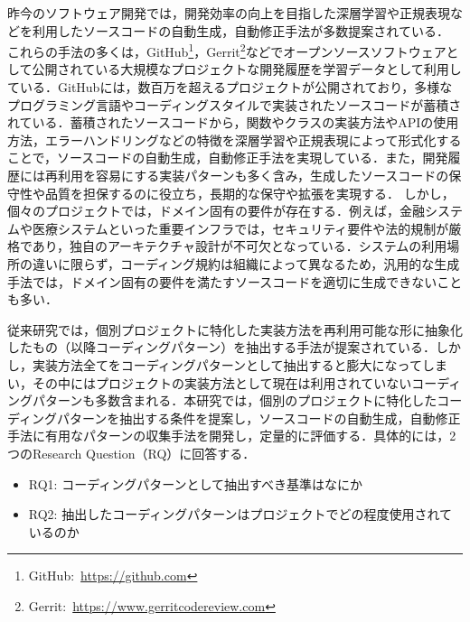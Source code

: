 \documentclass[submit,techrep,noauthor]{ipsj}
\newcommand{\RQone}{コーディングパターンとして抽出すべき基準はなにか}
\newcommand{\RQtwo}{抽出したコーディングパターンはプロジェクトでどの程度使用されているのか}
\begin{document}
昨今のソフトウェア開発では，開発効率の向上を目指した深層学習や正規表現などを利用したソースコードの自動生成，自動修正手法が多数提案されている\cite{deep_learnnig1}\cite{deep_learning2}\cite{deep_learnnig3}\cite{deep_learnning4}．
これらの手法の多くは，GitHub\footnote{GitHub:~\url{https://github.com}}，Gerrit\footnote{Gerrit:~\url{https://www.gerritcodereview.com}}などでオープンソースソフトウェアとして公開されている大規模なプロジェクトな開発履歴を学習データとして利用している．GitHubには，数百万を超えるプロジェクトが公開されており，多様なプログラミング言語やコーディングスタイルで実装されたソースコードが蓄積されている．蓄積されたソースコードから，関数やクラスの実装方法やAPIの使用方法，エラーハンドリングなどの特徴を深層学習や正規表現によって形式化することで，ソースコードの自動生成，自動修正手法を実現している．また，開発履歴には再利用を容易にする実装パターンも多く含み，生成したソースコードの保守性や品質を担保するのに役立ち，長期的な保守や拡張を実現する．
しかし，個々のプロジェクトでは，ドメイン固有の要件が存在する．例えば，金融システムや医療システムといった重要インフラでは，セキュリティ要件や法的規制が厳格であり，独自のアーキテクチャ設計が不可欠となっている\cite{finacial}\cite{financial2}\cite{medical}．システムの利用場所の違いに限らず，コーディング規約は組織によって異なるため，汎用的な生成手法では，ドメイン固有の要件を満たすソースコードを適切に生成できないことも多い．

従来研究では，個別プロジェクトに特化した実装方法を再利用可能な形に抽象化したもの（以降コーディングパターン）を抽出する手法が提案されている．しかし，実装方法全てをコーディングパターンとして抽出すると膨大になってしまい，その中にはプロジェクトの実装方法として現在は利用されていないコーディングパターンも多数含まれる．本研究では，個別のプロジェクトに特化したコーディングパターンを抽出する条件を提案し，ソースコードの自動生成，自動修正手法に有用なパターンの収集手法を開発し，定量的に評価する．具体的には，2つのResearch Question（RQ）に回答する．
\begin{itemize}
    \item RQ1: \RQone
    \item RQ2: \RQtwo
\end{itemize}
\end{document}
